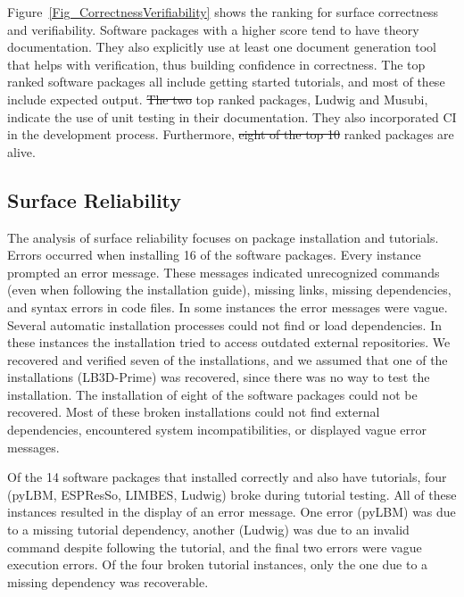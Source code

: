 \documentclass[final, 3p, times, authoryear]{elsarticle}
\newcommand{\esp}{ESPResSo\nolinebreak\hspace{-.05em}\raisebox{.4ex}{\small\bf
+}\nolinebreak\hspace{-.10em}\raisebox{.4ex}{\small\bf +}}
\providecommand{\DIFaddtex}[1]{{\protect\color{blue}\uwave{#1}}} %
\providecommand{\DIFdeltex}[1]{{\protect\color{red}\sout{#1}}}                      %
\providecommand{\DIFaddbegin}{} %
\providecommand{\DIFaddend}{} %
\providecommand{\DIFdelbegin}{} %
\providecommand{\DIFdelend}{} %
\providecommand{\DIFadd}[1]{\texorpdfstring{\DIFaddtex{#1}}{#1}} %
\providecommand{\DIFdel}[1]{\texorpdfstring{\DIFdeltex{#1}}{}} %
\begin{document}
Figure~\ref{Fig_CorrectnessVerifiability} shows the ranking for surface
correctness and verifiability. Software packages with a higher score tend to
have theory documentation. They also explicitly use at least one document
generation tool that helps with verification, thus building confidence in
correctness. The top ranked software packages all include getting started
tutorials, and most of these include expected output. \DIFdelbegin \DIFdel{The two }\DIFdelend \DIFaddbegin \DIFadd{Two of the }\DIFaddend top ranked
packages, Ludwig and Musubi, indicate the use of unit testing in their
documentation. They also incorporated CI in the development process.
Furthermore, \DIFdelbegin \DIFdel{eight of the top 10 }\DIFdelend \DIFaddbegin \DIFadd{all the top 5 }\DIFaddend ranked packages are alive.

\subsection{Surface Reliability}

The analysis of surface reliability focuses on package installation and
tutorials. Errors occurred when installing 16 of the software packages. Every
instance prompted an error message. These messages indicated unrecognized
commands (even when following the installation guide), missing links, missing
dependencies, and syntax errors in code files. In some instances the error
messages were vague. Several automatic installation processes could not find or
load dependencies. In these instances the installation tried to access outdated
external repositories. We recovered and verified seven of the installations, and
we assumed that one of the installations (LB3D-Prime) was recovered, since there
was no way to test the installation. The installation of eight of the software
packages could not be recovered. Most of these broken installations could not
find external dependencies, encountered system incompatibilities, or displayed
vague error messages.

Of the 14 software packages that installed correctly and also have tutorials,
four (pyLBM, \esp, LIMBES, Ludwig) broke during tutorial testing. All of these
instances resulted in the display of an error message. One error (pyLBM) was due
to a missing tutorial dependency, another (Ludwig) was due to an invalid command
despite following the tutorial, and the final two errors were vague execution
errors. Of the four broken tutorial instances, only the one due to a missing
dependency was recoverable. 
\end{document}
